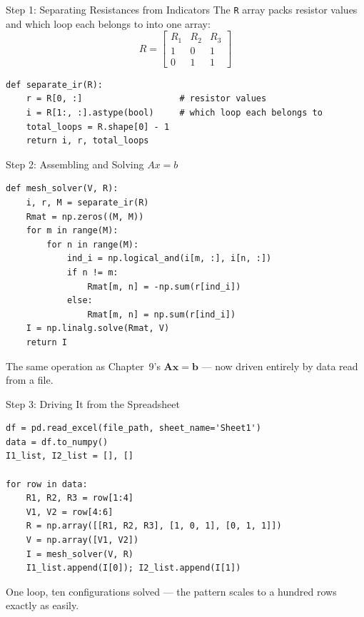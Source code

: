 \documentclass[9pt,aspectratio=169,xcolor=table]{beamer}
\begin{document}
\begin{frame}[fragile]{Step 1: Separating Resistances from Indicators}
    \leavevmode
    The \texttt{R} array packs resistor values \alert{and} which loop
    each belongs to into one array:
    \[
    R =
    \begin{bmatrix}
    R_1 & R_2 & R_3 \\
    1 & 0 & 1 \\
    0 & 1 & 1
    \end{bmatrix}
    \]

\begin{lstlisting}
def separate_ir(R):
    r = R[0, :]                   # resistor values
    i = R[1:, :].astype(bool)     # which loop each belongs to
    total_loops = R.shape[0] - 1
    return i, r, total_loops
\end{lstlisting}
\end{frame}

\begin{frame}[fragile]{Step 2: Assembling and Solving \texorpdfstring{$Ax=b$}{Ax=b}}
    \leavevmode
\begin{lstlisting}
def mesh_solver(V, R):
    i, r, M = separate_ir(R)
    Rmat = np.zeros((M, M))
    for m in range(M):
        for n in range(M):
            ind_i = np.logical_and(i[m, :], i[n, :])
            if n != m:
                Rmat[m, n] = -np.sum(r[ind_i])
            else:
                Rmat[m, n] = np.sum(r[ind_i])
    I = np.linalg.solve(Rmat, V)
    return I
\end{lstlisting}

    {\small The same operation as Chapter~9's $\mathbf{Ax=b}$ ---
    now driven entirely by data read from a file.}
\end{frame}

\begin{frame}[fragile]{Step 3: Driving It from the Spreadsheet}
    \leavevmode
\begin{lstlisting}
df = pd.read_excel(file_path, sheet_name='Sheet1')
data = df.to_numpy()
I1_list, I2_list = [], []

for row in data:
    R1, R2, R3 = row[1:4]
    V1, V2 = row[4:6]
    R = np.array([[R1, R2, R3], [1, 0, 1], [0, 1, 1]])
    V = np.array([V1, V2])
    I = mesh_solver(V, R)
    I1_list.append(I[0]); I2_list.append(I[1])
\end{lstlisting}

    {\small One loop, ten configurations solved --- the pattern
    scales to a hundred rows exactly as easily.}
\end{frame}
\end{document}
